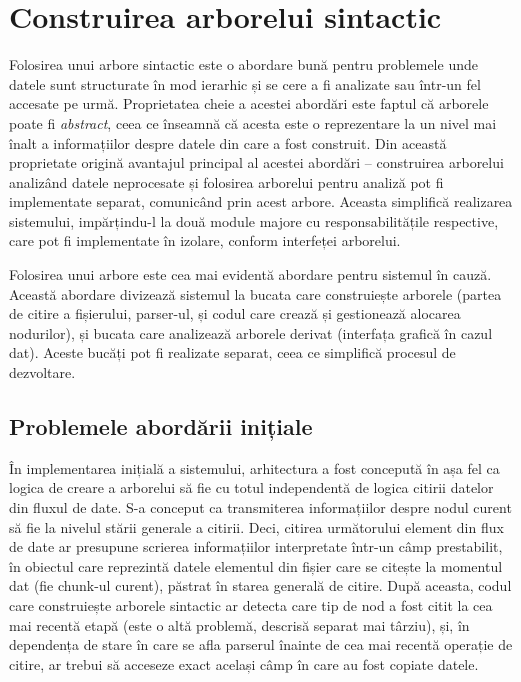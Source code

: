 \documentclass[a4paper,12pt]{report}
\begin{document}
\chapter{Construirea arborelui sintactic}

Folosirea unui arbore sintactic este o abordare bună pentru problemele 
unde datele sunt structurate în mod ierarhic și se cere a fi analizate sau într-un fel accesate pe urmă.
Proprietatea cheie a acestei abordări este faptul că arborele poate fi \textit{abstract},
ceea ce înseamnă că acesta este o reprezentare la un nivel mai înalt a informațiilor despre datele
din care a fost construit.
Din această proprietate origină avantajul principal al acestei abordări --
construirea arborelui analizând datele neprocesate și folosirea arborelui
pentru analiză pot fi implementate separat, comunicând prin acest arbore.
Aceasta simplifică realizarea sistemului, impărțindu-l la două module majore cu responsabilitățile respective,
care pot fi implementate în izolare, conform interfeței arborelui.

Folosirea unui arbore este cea mai evidentă abordare pentru sistemul în cauză.
Această abordare divizează sistemul la bucata care construiește arborele
(partea de citire a fișierului, parser-ul, și codul care crează și gestionează alocarea nodurilor),
și bucata care analizează arborele derivat (interfața grafică în cazul dat).
Aceste bucăți pot fi realizate separat, ceea ce simplifică procesul de dezvoltare.

\section{Problemele abordării inițiale}

În implementarea inițială a sistemului, arhitectura a fost concepută în așa fel ca
logica de creare a arborelui să fie cu totul independentă de logica citirii datelor din fluxul de date.
S-a conceput ca transmiterea informațiilor despre nodul curent să fie la nivelul stării generale a citirii.
Deci, citirea următorului element din flux de date ar presupune scrierea informațiilor interpretate
într-un câmp prestabilit, în obiectul care reprezintă datele elementul
din fișier care se citește la momentul dat (fie chunk-ul curent), păstrat în starea generală de citire.
După aceasta, codul care construiește arborele sintactic ar detecta care tip de nod a fost citit la cea mai recentă etapă 
(este o altă problemă, descrisă separat mai târziu),
și, în dependența de stare în care se afla parserul înainte de cea mai recentă operație de citire,
ar trebui să acceseze exact același câmp în care au fost copiate datele.
\end{document}
